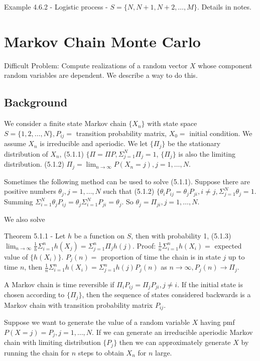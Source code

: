 \documentclass{article}
\begin{document}
Example 4.6.2 - Logistic process - $S = \{N, N+1, N+2, \dots, M\}$. Details in notes.

\section{Markov Chain Monte Carlo}

Difficult Problem: Compute realizations of a random vector $X$ whose component random variables are dependent. We describe a way to do this.

\subsection{Background}

We consider a finite state Markov chain $\{X_n\}$ with state space $S = \{1, 2, \dots, N\}, P_{ij} =$ transition probability matrix, $X_0 =$ initial condition. We assume $X_n$ is irreducible and aperiodic. We let $\{\Pi_j\}$ be the stationary distribution of $X_n$, (5.1.1) $\{\Pi = \Pi P, \Sigma_{j=1}^N \Pi_j = 1$, $\{\Pi_j\}$ is also the limiting distribution. (5.1.2) $\Pi_j = \lim_{n \rightarrow \infty} P(X_n = j), j = 1, \dots, N$.

Sometimes the following method can be used to solve (5.1.1). Suppose there are positive numbers $\theta_j, j = 1, \dots, N$ such that (5.1.2) $\{\theta_i P_{ij} = \theta_j P_{ji}, i \ne j, \Sigma_{j=1}^N \theta_j = 1$. Summing $\Sigma_{i=1}^N \theta_j P_{ij} = \theta_j \Sigma_{i=1}^N P_{ji} = \theta_j$. So $\theta_j = \Pi_{ji}, j = 1, \dots, N$.

We also solve

Theorem 5.1.1 - Let $h$ be a function on $S$, then with probability 1, (5.1.3) $\lim_{n \rightarrow \infty} \frac{1}{h} \Sigma_{i=1}^n h(X_j) = \Sigma_{j=1}^n \Pi_j h(j)$. Proof: $\frac{1}{n} \Sigma_{i=1}^n h(X_i) =$ expected value of $\{h(X_i)\}$. $P_j(n) =$ proportion of time the chain is in state $j$ up to time $n$, then $\frac{1}{n} \Sigma_{i=1}^n h(X_i) = \Sigma_{j=1}^n h(j) P_j(n)$ as $n \rightarrow \infty, P_j(n) \rightarrow \Pi_j$.

A Markov chain is time reversible if $\Pi_i P_{ij} = \Pi_j P_{ji}, j \ne i$. If the initial state is chosen according to $\{\Pi_j\}$, then the sequence of states considered backwards is a Markov chain with transition probability matrix $P_{ij}$.

Suppose we want to generate the value of a random variable $X$ having pmf $P(X=j) = P_j, j = 1, \dots, N$. If we can generate an irreducible aperiodic Markov chain with limiting distribution $\{P_j\}$ then we can approximately generate $X$ by running the chain for $n$ steps to obtain $X_n$ for $n$ large.
\end{document}
